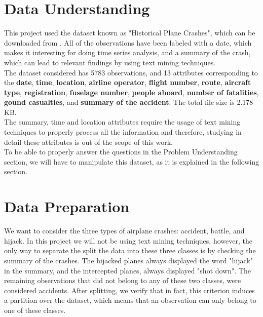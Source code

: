 \documentclass[12pt]{article}
\begin{document}
\section{Data Understanding}
This project used the dataset known as "Historical Plane Crashes", which can be downloaded from \cite{bib:dataset}. All of the observations have been labeled with a date, which makes it interesting for doing time series analysis, and a summary of the crash, which can lead to relevant findings by using text mining techniques.\\

The dataset considered has 5783 observations, and 13 attributes corresponding to the \textbf{date}, \textbf{time}, \textbf{location}, \textbf{airline operator}, \textbf{flight number}, \textbf{route}, \textbf{aircraft type}, \textbf{registration}, \textbf{fuselage number}, \textbf{people aboard}, \textbf{number of fatalities}, \textbf{gound casualties}, and \textbf{summary of the accident}. The total file size is 2.178 KB.\\

The summary, time and location attributes require the usage of text mining techniques to properly process all the information and therefore, studying in detail these attributes is out of the scope of this work.\\

To be able to properly answer the questions in the Problem Understanding section, we will have to manipulate this dataset, as it is explained in the following section.\\
	
\section{Data Preparation}

We want to consider the three types of airplane crashes: accident, battle, and hijack. In this project we will not be using text mining techniques, however, the only way to separate the split the data into these three classes is by checking the summary of the crashes. The hijacked planes always displayed the word "hijack" in the summary, and the intercepted planes, always displayed "shot down". The remaining observations that did not belong to any of these two classes, were considered accidents. After splitting, we verify that in fact, this criterion induces a partition over the dataset, which means that an observation can only belong to one of these classes.\\
\end{document}
